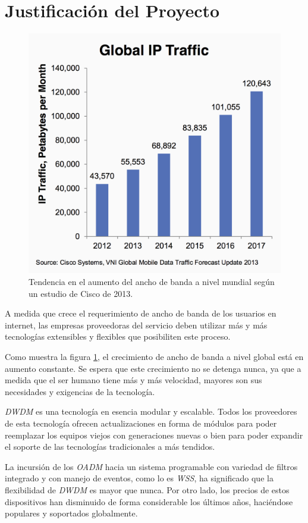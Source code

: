 \section{Justificaci\'on del Proyecto}\label{sec:justificacion}

\begin{figure}[H]
  \centering
  \includegraphics[width=12cm]{Imagenes/aumento_bw.png}
  \caption{Tendencia en el aumento del ancho de banda a nivel mundial
    según un estudio de Cisco de 2013.}
  \label{fig:aumento_bw}
\end{figure}

A medida que crece el requerimiento de ancho de banda de los usuarios
en internet, las empresas proveedoras del servicio deben utilizar más
y más tecnologías extensibles y flexibles que posibiliten este
proceso.

Como muestra la figura \ref{fig:aumento_bw}, el crecimiento de ancho
de banda a nivel global está en aumento constante. Se espera que este
crecimiento no se detenga nunca, ya que a medida que el ser humano
tiene más y más velocidad, mayores son sus necesidades y exigencias de
la tecnología.

\emph{DWDM} es una tecnología en esencia modular y escalable. Todos
los proveedores de esta tecnología ofrecen actualizaciones en forma de
módulos para poder reemplazar los equipos viejos con generaciones
nuevas o bien para poder expandir el soporte de las tecnologías
tradicionales a más tendidos.

La incursión de los \emph{OADM} hacia un sistema programable con
variedad de filtros integrado y con manejo de eventos, como lo es
\emph{WSS}, ha significado que la flexibilidad de \emph{DWDM} es mayor
que nunca. Por otro lado, los precios de estos dispositivos han
disminuido de forma considerable los últimos años, haciéndose
populares y soportados globalmente.

